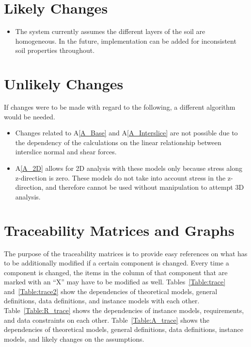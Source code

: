 \documentclass[12pt]{article}
\newcommand{\aref}[1]{A\ref{#1}}
\newcounter{lcnum} %
\newcommand{\lthelcnum}{LC\thelcnum}
\newcounter{ucnum} %
\newcommand{\ltheucnum}{UC\theucnum}
\begin{document}

\section{Likely Changes}

\noindent \begin{itemize}
\item[\refstepcounter{lcnum}\lthelcnum \label{LC_inhomogeneous}:] The system 
currently assumes the different layers of the soil are homogeneous.
 In the future, implementation can be added for inconsistent soil properties 
 throughout.
\end{itemize}

\section{Unlikely Changes}
If changes were to be made with regard to the following,
a different algorithm would be needed.

\begin{itemize}
\item[\refstepcounter{ucnum}\ltheucnum \label{UC_insf}:] Changes related to 
\aref{A_Base} and \aref{A_Interslice} are not possible
 due to the dependency of the calculations on the linear relationship between 
 interslice normal and shear forces.
\item[\refstepcounter{ucnum}\ltheucnum \label{UC_inhomogeneous}:] \aref{A_2D} 
allows for 2D analysis with these models only because stress along z-direction 
is zero. 
These models do not take into account stress in the z-direction, and therefore 
cannot be used without manipulation to attempt 3D analysis.
\end{itemize}


\section{Traceability Matrices and Graphs}

The purpose of the traceability matrices is to provide easy references on what
has to be additionally modified if a certain component is changed.  Every time a
component is changed, the items in the column of that component that are marked
with an ``X'' may have to be modified as well.  Tables~\ref{Table:trace} 
and~\ref{Table:trace2} show the dependencies of theoretical models, general 
definitions, data definitions, and instance models with each other. 
Table~\ref{Table:R_trace} shows the dependencies of instance models, 
requirements, and data constraints on each other. Table~\ref{Table:A_trace} 
shows the dependencies of theoretical models, general definitions, data 
definitions, instance models, and likely changes on the assumptions.
\end{document}
